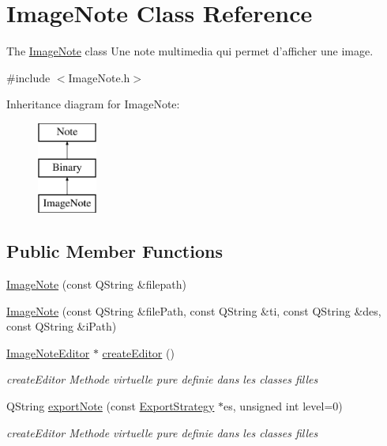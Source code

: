 \hypertarget{class_image_note}{\section{Image\-Note Class Reference}
\label{class_image_note}
}


The \hyperlink{class_image_note}{Image\-Note} class Une note multimedia qui permet d'afficher une image.  




{\ttfamily \#include $<$Image\-Note.\-h$>$}

Inheritance diagram for Image\-Note\-:\begin{figure}[H]
\begin{center}
\leavevmode
\includegraphics[height=3.000000cm]{class_image_note}
\end{center}
\end{figure}
\subsection*{Public Member Functions}
\begin{DoxyCompactItemize}
\item 
\hyperlink{class_image_note_a3d310febd39f7fb135f399ad0f5dedb0}{Image\-Note} (const Q\-String \&filepath)
\item 
\hyperlink{class_image_note_a94a155a91300c8e8cce36278a6d9959d}{Image\-Note} (const Q\-String \&file\-Path, const Q\-String \&ti, const Q\-String \&des, const Q\-String \&i\-Path)
\item 
\hyperlink{class_image_note_editor}{Image\-Note\-Editor} $\ast$ \hyperlink{class_image_note_a06def8412672f996f5e964b861442a63}{create\-Editor} ()
\begin{DoxyCompactList}\small\item\em create\-Editor Methode virtuelle pure definie dans les classes filles \end{DoxyCompactList}\item 
Q\-String \hyperlink{class_image_note_a64507436f2cb2ff24ece73baa552b7bb}{export\-Note} (const \hyperlink{class_export_strategy}{Export\-Strategy} $\ast$es, unsigned int level=0)
\begin{DoxyCompactList}\small\item\em create\-Editor Methode virtuelle pure definie dans les classes filles \end{DoxyCompactList}\end{DoxyCompactItemize}
